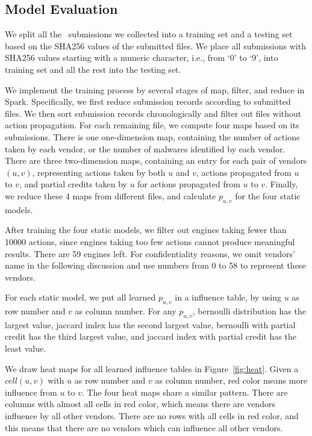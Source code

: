 \subsection{Model Evaluation}
\label{sec:predict}

We split all the \pe\ submissions we collected into a training set and a testing set based on the SHA256 values of the submitted files. 
We place all submissions with SHA256 values starting with a numeric character, 
i.e., from ‘0’ to ‘9’, into training set
and all the rest into the testing set.

We implement the training process by several stages of map, filter, and reduce in Spark. 
Specifically, we first reduce submission records according to submitted files. 
We then sort submission records chronologically
and filter out files without action propagation.
For each remaining file, we compute four maps based on its submissions.
There is one one-dimension map, 
containing the number of actions taken by each vendor, 
or the number of malwares identified by each vendor. 
There are three two-dimension maps, 
containing an entry for each pair of vendors $(u,v)$, 
representing actions taken by both $u$ and $v$, actions propagated from $u$ to $v$, 
and partial credits taken by $u$ for actions propagated from $u$ to $v$. 
Finally, we reduce these 4 maps from different files, 
and calculate $p_{u,v}$ for the four static models. 

After training the four static models, 
we filter out engines taking fewer than 10000 actions,
since engines taking too few actions cannot produce meaningful results.
There are 59 engines left.
For confidentiality reasons, we omit vendors’ name in the following discussion
and use numbers from 0 to 58 to represent these vendors.

For each static model, 
we put all learned $p_{u,v}$ in a influence table, 
by using $u$ as row number and $v$ as column number.
For any $p_{u,v}$, bernoulli distribution has the largest value, 
jaccard index has the second largest value, 
bernoulli with partial credit has the third largest value,
and jaccard index with partial credit has the least value. 



We draw heat maps for all learned influence tables in Figure~\ref{fig:heat}. 
Given a $cell(u, v)$ with $u$ as row number and $v$ as column number, 
red color means more influence from $u$ to $v$. 
The four heat maps share a similar pattern.
There are columns with almost all cells in red color, 
which means there are vendors influence by all other vendors. 
There are no rows with all cells in red color, 
and this means that there are no vendors which can influence all other vendors. 

